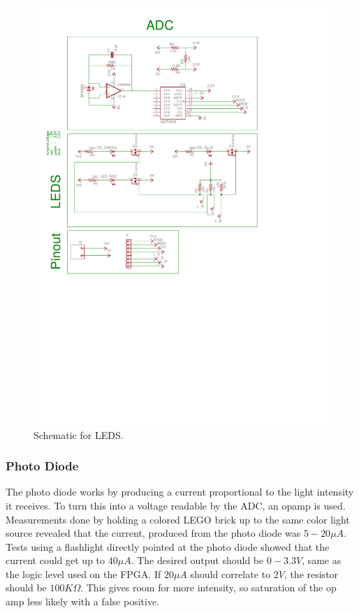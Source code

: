 \begin{figure}[ht]
\centering
 \includegraphics[scale=0.9,trim={2.4cm 14cm 5.1cm 9cm},clip]{img/adc_schematic.pdf}
  \caption{Schematic for LEDS.}
  \label{fig:sch_led}
\end{figure}

\subsubsection{Photo Diode}
The photo diode works by producing a current proportional to the light intensity it receives.
To turn this into a voltage readable by the ADC, an opamp is used.
Measurements done by holding a colored LEGO brick up to the same color light source revealed that the current, produced from the photo diode was $5-20 \mu A$.
Tests using a flashlight directly pointed at the photo diode showed that the current could get up to $40 \mu A$.
The desired output should be $0-3.3 V$, same as the logic level used on the FPGA.
If $20 \mu A$ should correlate to $2 V$, the resistor should be $100K\Omega$. 
This gives room for more intensity, so saturation of the op amp less likely with a false positive.

